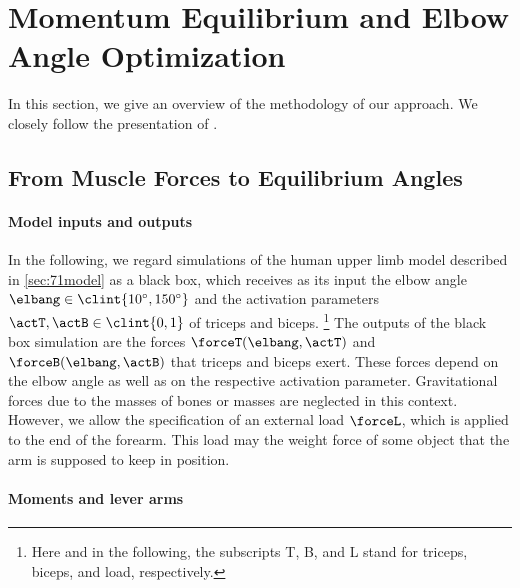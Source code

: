 \section{Momentum Equilibrium and Elbow Angle Optimization}
\label{sec:72methodology}


\noindent
In this section, we give an overview of the methodology of our approach.
We closely follow the presentation of \cite{Valentin18Gradient}.



\subsection{From Muscle Forces to Equilibrium Angles}
\label{sec:721equilibrium}

\paragraph{Model inputs and outputs}

In the following, we regard simulations of the
human upper limb model described in \cref{sec:71model} as a black box,
which receives as its input
the elbow angle $\elbang \in \clint{\ang{10}, \ang{150}}$
and the activation parameters $\actT, \actB \in \clint{0, 1}$
of triceps and biceps.%
\footnote{%
  Here and in the following, the subscripts T, B, and L stand for
  triceps, biceps, and load, respectively.%
}
The outputs of the black box simulation are the forces
$\forceT(\elbang, \actT)$ and $\forceB(\elbang, \actB)$
that triceps and biceps exert.
These forces depend on the elbow angle as well as on the respective
activation parameter.
Gravitational forces due to the masses of bones or masses
are neglected in this context.
However, we allow the specification of an external load $\forceL$,
which is applied to the end of the forearm.
This load may the weight force of some object
that the arm is supposed to keep in position.

\paragraph{Moments and lever arms}

